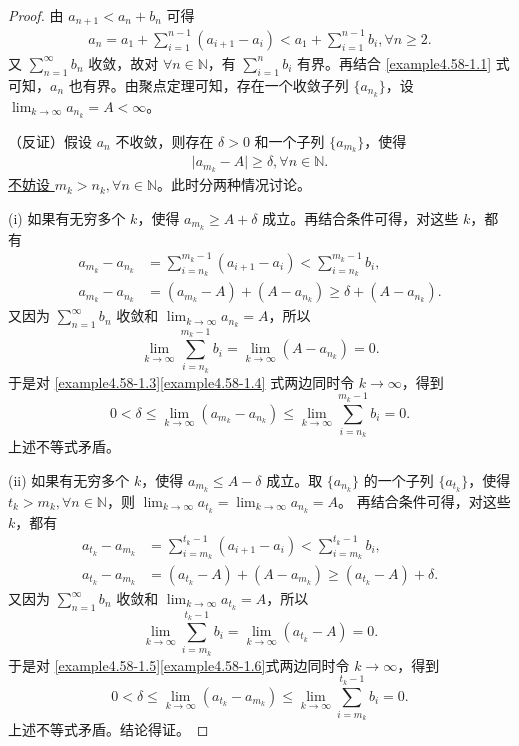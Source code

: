 \documentclass[../../main.tex]{subfiles}
\begin{document}
\begin{proof}
由 \(a_{n + 1} < a_n + b_n\) 可得
\begin{align}
a_n = a_1 + \sum_{i = 1}^{n - 1} (a_{i + 1} - a_i) < a_1 + \sum_{i = 1}^{n - 1} b_i, \forall n \geqslant 2. \label{example4.58-1.1}
\end{align}
又 \(\sum_{n = 1}^{\infty} b_n\) 收敛，故对 \(\forall n \in \mathbb{N}\)，有 \(\sum_{i = 1}^n b_i\) 有界。再结合 \eqref{example4.58-1.1} 式可知，\(a_n\) 也有界。由聚点定理可知，存在一个收敛子列 \(\{ a_{n_k} \}\)，设 \(\lim_{k \to \infty} a_{n_k} = A < \infty\)。

（反证）假设 \(a_n\) 不收敛，则存在 \(\delta > 0\) 和一个子列 \(\{ a_{m_k} \}\)，使得
\begin{align*}
\vert a_{m_k} - A \vert \geqslant \delta, \forall n \in \mathbb{N}. 
\end{align*}
\hyperlink{example4.58不妨设的原因}{不妨设 \(m_k > n_k, \forall n \in \mathbb{N}\)}。此时分两种情况讨论。

(i) 如果有无穷多个 \(k\)，使得 \(a_{m_k} \geqslant A + \delta\) 成立。再结合条件可得，对这些 \(k\)，都有
\begin{align}
a_{m_k} - a_{n_k} &= \sum_{i = n_k}^{m_k - 1} (a_{i + 1} - a_i) < \sum_{i = n_k}^{m_k - 1} b_i, \label{example4.58-1.3}\\
a_{m_k} - a_{n_k} &= (a_{m_k} - A) + (A - a_{n_k}) \geqslant \delta + (A - a_{n_k}). \label{example4.58-1.4}
\end{align}
又因为 \(\sum_{n = 1}^{\infty} b_n\) 收敛和 \(\lim_{k \to \infty} a_{n_k} = A\)，所以
\[
\lim_{k \to \infty} \sum_{i = n_k}^{m_k - 1} b_i = \lim_{k \to \infty} (A - a_{n_k}) = 0.
\]
于是对 \eqref{example4.58-1.3}\eqref{example4.58-1.4} 式两边同时令 \(k \to \infty\)，得到
\[
0 < \delta \leqslant \lim_{k \to \infty} (a_{m_k} - a_{n_k}) \leqslant \lim_{k \to \infty} \sum_{i = n_k}^{m_k - 1} b_i = 0.
\]
上述不等式矛盾。

(ii) 如果有无穷多个 \(k\)，使得 \(a_{m_k} \leqslant A - \delta\) 成立。取 \(\{ a_{n_k} \}\) 的一个子列 \(\{ a_{t_k} \}\)，使得 \(t_k > m_k, \forall n \in \mathbb{N}\)，则 \(\lim_{k \to \infty} a_{t_k} = \lim_{k \to \infty} a_{n_k} = A\)。
再结合条件可得，对这些 \(k\)，都有
\begin{align}
a_{t_k} - a_{m_k} &= \sum_{i = m_k}^{t_k - 1} (a_{i + 1} - a_i) < \sum_{i = m_k}^{t_k - 1} b_i, \label{example4.58-1.5}\\
a_{t_k} - a_{m_k} &= (a_{t_k} - A) + (A - a_{m_k}) \geqslant (a_{t_k} - A) + \delta. \label{example4.58-1.6}
\end{align}
又因为 \(\sum_{n = 1}^{\infty} b_n\) 收敛和 \(\lim_{k \to \infty} a_{t_k} = A\)，所以
\[
\lim_{k \to \infty} \sum_{i = m_k}^{t_k - 1} b_i = \lim_{k \to \infty} (a_{t_k} - A) = 0.
\]
于是对 \eqref{example4.58-1.5}\eqref{example4.58-1.6}式两边同时令 \(k \to \infty\)，得到
\[
0 < \delta \leqslant \lim_{k \to \infty} (a_{t_k} - a_{m_k}) \leqslant \lim_{k \to \infty} \sum_{i = m_k}^{t_k - 1} b_i = 0.
\]
上述不等式矛盾。结论得证。

\end{proof}
\end{document}
